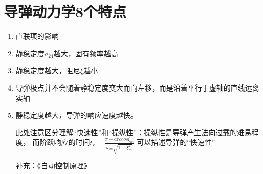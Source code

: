 \section{导弹动力学8个特点}
\begin{enumerate}[1)]
    \item 直联项的影响
    \item 静稳定度$a_{24}$越大，固有频率越高
    \item 静稳定度越大，阻尼$\xi$越小
    \item 导弹极点并不会随着静稳定度变大而向左移，而是沿着平行于虚轴的直线远离实轴
    \item 静稳定度越大，导弹的响应速度越快。
    
    {\kaishu 此处注意区分理解“快速性”和“操纵性”：操纵性是导弹产生法向过载的难易程度，
    而阶跃响应的时间$t_r = \frac{\pi - arccos\xi_{\dot{m}}}{\omega_{m}\sqrt{1-\xi_{m}^2}}$
    可以描述导弹的“快速性”
    
    补充：《自动控制原理》
    
}
\end{enumerate}
